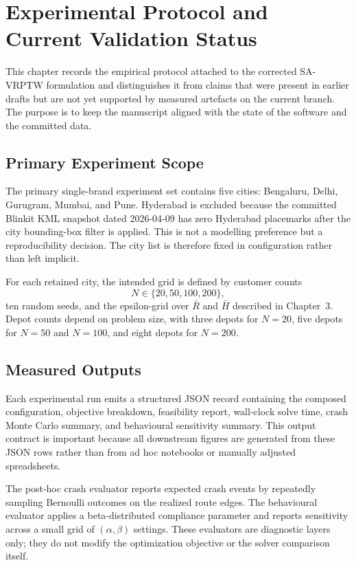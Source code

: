 \chapter{Experimental Protocol and Current Validation Status}

This chapter records the empirical protocol attached to the corrected SA-VRPTW formulation and distinguishes it from claims that were present in earlier drafts but are not yet supported by measured artefacts on the current branch. The purpose is to keep the manuscript aligned with the state of the software and the committed data.

\section{Primary Experiment Scope}

The primary single-brand experiment set contains five cities: Bengaluru, Delhi, Gurugram, Mumbai, and Pune. Hyderabad is excluded because the committed Blinkit KML snapshot dated 2026-04-09 has zero Hyderabad placemarks after the city bounding-box filter is applied. This is not a modelling preference but a reproducibility decision. The city list is therefore fixed in configuration rather than left implicit.

For each retained city, the intended grid is defined by customer counts
\[
N \in \{20, 50, 100, 200\},
\]
ten random seeds, and the epsilon-grid over $\bar{R}$ and $\bar{H}$ described in Chapter~3. Depot counts depend on problem size, with three depots for $N=20$, five depots for $N=50$ and $N=100$, and eight depots for $N=200$.

\section{Measured Outputs}

Each experimental run emits a structured JSON record containing the composed configuration, objective breakdown, feasibility report, wall-clock solve time, crash Monte Carlo summary, and behavioural sensitivity summary. This output contract is important because all downstream figures are generated from these JSON rows rather than from ad hoc notebooks or manually adjusted spreadsheets.

The post-hoc crash evaluator reports expected crash events by repeatedly sampling Bernoulli outcomes on the realized route edges. The behavioural evaluator applies a beta-distributed compliance parameter and reports sensitivity across a small grid of $(\alpha,\beta)$ settings. These evaluators are diagnostic layers only; they do not modify the optimization objective or the solver comparison itself.


